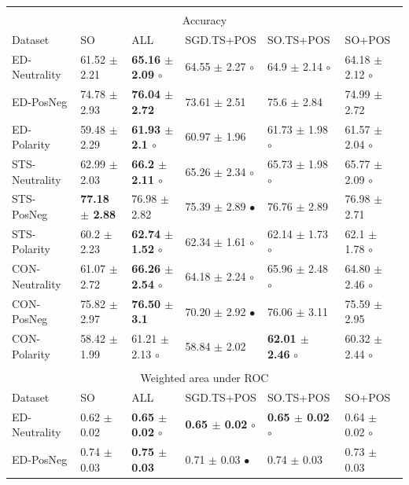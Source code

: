 \documentclass{sig-alternate}
\begin{document}
\begin{table}[htbp]
\begin{center}
\begin{tabular}{|l|l|l|l|l|l|}
\hline
\multicolumn{ 6}{|c|}{} \\ 
\multicolumn{ 6}{|c|}{Accuracy } \\ \hline
Dataset & SO & ALL & SGD.TS+POS & SO.TS+POS & SO+POS \\ \hline
ED-Neutrality & 61.52 $\pm$ 2.21 & \textbf{65.16 $\pm$ 2.09} $\circ$ & 64.55 $\pm$ 2.27 $\circ$ & 64.9 $\pm$ 2.14  $\circ$ & 64.18 $\pm$ 2.12 $\circ$ \\ 
ED-PosNeg & 74.78 $\pm$ 2.93 & \textbf{76.04 $\pm$ 2.72} & 73.61 $\pm$ 2.51 & 75.6 $\pm$ 2.84 & 74.99 $\pm$ 2.72 \\ 
ED-Polarity & 59.48 $\pm$ 2.29 & \textbf{61.93 $\pm$ 2.1 $\circ$} & 60.97 $\pm$ 1.96 & 61.73 $\pm$ 1.98 $\circ$ & 61.57 $\pm$ 2.04 $\circ$ \\  \hline
STS-Neutrality & 62.99 $\pm$ 2.03 & \textbf{66.2 $\pm$ 2.11 $\circ$} & 65.26 $\pm$ 2.34 $\circ$ & 65.73 $\pm$ 1.98 $\circ$ & 65.77 $\pm$ 2.09 $\circ$ \\ 
STS-PosNeg & \textbf{77.18 $\pm$ 2.88} & 76.98 $\pm$ 2.82 & 75.39 $\pm$ 2.89 $\bullet$ & 76.76 $\pm$ 2.89 & 76.98 $\pm$ 2.71 \\ 
STS-Polarity & 60.2 $\pm$ 2.23 & \textbf{62.74 $\pm$ 1.52} $\circ$ & 62.34 $\pm$ 1.61 $\circ$ & 62.14 $\pm$ 1.73 $\circ$ & 62.1 $\pm$ 1.78 $\circ$ \\  \hline
CON-Neutrality & 61.07 $\pm$ 2.72 & \textbf{66.26 $\pm$ 2.54} $\circ$ & 64.18 $\pm$ 2.24  $\circ$ & 65.96 $\pm$ 2.48 $\circ$ & 64.80 $\pm$ 2.46 $\circ$ \\ 
CON-PosNeg & 75.82 $\pm$ 2.97 & \textbf{76.50 $\pm$ 3.1} & 70.20 $\pm$ 2.92 $\bullet$  & 76.06 $\pm$ 3.11  & 75.59 $\pm$ 2.95 \\ 
CON-Polarity & 58.42 $\pm$ 1.99 & 61.21 $\pm$ 2.13 $\circ$ & 58.84 $\pm$ 2.02 & \textbf{62.01 $\pm$ 2.46} $\circ$ & 60.32 $\pm$ 2.44 $\circ$ \\ \hline
\multicolumn{ 6}{|c|}{} \\ 
\multicolumn{ 6}{|c|}{Weighted area under ROC } \\ \hline
Dataset & SO & ALL & SGD.TS+POS & SO.TS+POS & SO+POS \\ \hline
ED-Neutrality & 0.62 $\pm$ 0.02 &  \textbf{0.65 $\pm$ 0.02} $\circ$ & \textbf{0.65 $\pm$ 0.02} $\circ$  & \textbf{0.65 $\pm$ 0.02} $\circ$ & 0.64 $\pm$ 0.02 $\circ$ \\ 
ED-PosNeg & 0.74 $\pm$ 0.03 & \textbf{0.75 $\pm$ 0.03} & 0.71 $\pm$ 0.03 $\bullet$ & 0.74 $\pm$ 0.03 & 0.73 $\pm$ 0.03 \\ 

\end{tabular}
\end{center}
\end{table}
\end{document}
